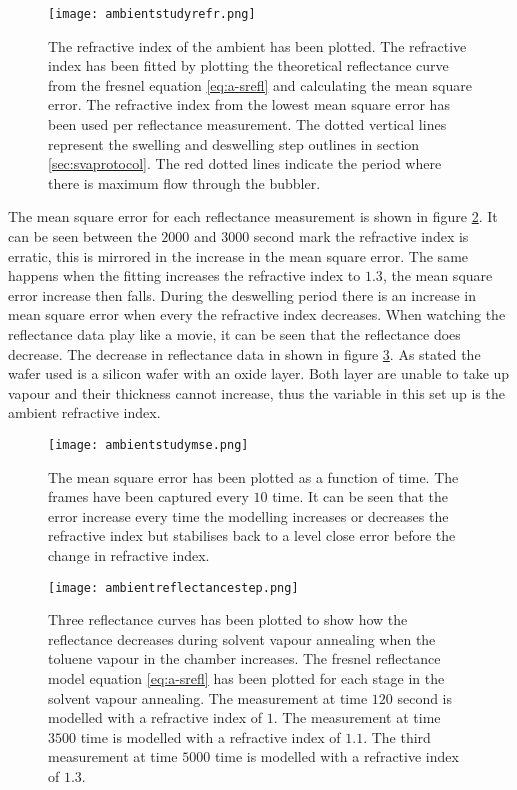 \documentclass[MasterThesisMain.tex]{subfiles}
\begin{document}
\begin{figure}
\centering
\texttt{[image: ambientstudyrefr.png]}
\caption{The refractive index of the ambient has been plotted. The refractive index has been fitted by plotting the theoretical reflectance curve from the fresnel equation \ref{eq:a-srefl} and calculating the mean square error. The refractive index from the lowest mean square error has been used per reflectance measurement. The dotted vertical lines represent the swelling and deswelling step outlines in section \ref{sec:svaprotocol}. The red dotted lines indicate the period where there is maximum flow through the bubbler.}
\label{fig:ambientrefr}
\end{figure}

The mean square error for each reflectance measurement is shown in figure \ref{fig:ambientmse}. It can be seen between the $2000$ and $3000$ second mark the refractive index is erratic, this is mirrored in the increase in the mean square error. The same happens when the fitting increases the refractive index to $1.3$, the mean square error increase then falls. During the deswelling period there is an increase in mean square error when every the refractive index decreases. When watching the reflectance data play like a movie, it can be seen that the reflectance does decrease. The decrease in reflectance data in shown in figure \ref{fig:ambientreflectance}. As stated the wafer used is a silicon wafer with an oxide layer. Both layer are unable to take up vapour and their thickness cannot increase, thus the variable in this set up is the ambient refractive index.

\begin{figure}
\centering
\texttt{[image: ambientstudymse.png]}
\caption{The mean square error has been plotted as a function of time. The frames have been captured every $10$ time. It can be seen that the error increase every time the modelling increases or decreases the refractive index but stabilises back to a level close error before the change in refractive index.}
\label{fig:ambientmse}
\end{figure}

\begin{figure}
\centering
\texttt{[image: ambientreflectancestep.png]}
\caption{Three reflectance curves has been plotted to show how the reflectance decreases during solvent vapour annealing when the toluene vapour in the chamber increases. The fresnel reflectance model equation \ref{eq:a-srefl} has been plotted for each stage in the solvent vapour annealing. The measurement at time $120$ second is modelled with a refractive index of $1$. The measurement at time $3500$ time is modelled with a refractive index of $1.1$. The third measurement at time $5000$ time is modelled with a refractive index of $1.3$.}
\label{fig:ambientreflectance}
\end{figure}
\end{document}
